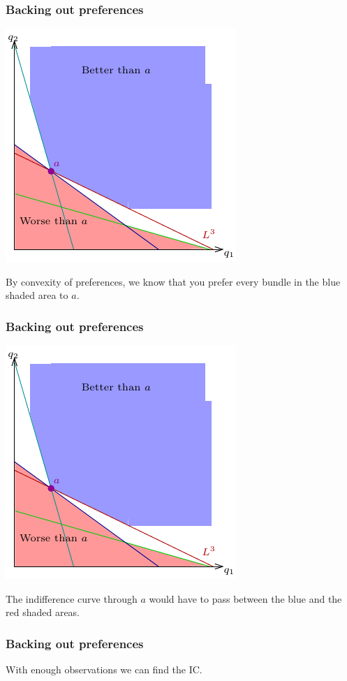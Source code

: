 \documentclass[xcolor=pdftex,dvipsnames]{beamer}
\begin{document}
\begin{frame}
\frametitle{Backing out preferences}
\begin{center}
\includegraphics{pics/RevPref7}
\end{center}
By convexity of preferences, we know that you prefer every bundle in
the blue shaded area to $a$.
\end{frame}

\begin{frame}
\frametitle{Backing out preferences}
\begin{center}
\includegraphics{pics/RevPref7}
\end{center}
The indifference curve through $a$ would have to pass between the blue
and the red shaded areas.
\end{frame}

\begin{frame}
\frametitle{Backing out preferences}
With enough observations we can find the IC. 

\bigskip
{}\end{frame}
\end{document}
